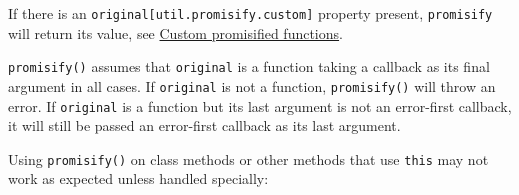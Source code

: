 \begin{Shaded}
\begin{Highlighting}[]
\OperatorTok{=} \NormalTok{(}\NormalTok{)}\OperatorTok{;}
\OperatorTok{=} \NormalTok{(}\NormalTok{)}\OperatorTok{;}

\OperatorTok{=}\NormalTok{)}\OperatorTok{;}

  \NormalTok{() \{}
  \OperatorTok{=}  \NormalTok{(}\NormalTok{)}\OperatorTok{;}
  \NormalTok{(}\SpecialCharTok{$\{}\SpecialCharTok{\}}\VerbatimStringTok{\textasciigrave{}}\NormalTok{)}\OperatorTok{;}
\NormalTok{\}}

\NormalTok{()}\OperatorTok{;}
\end{Highlighting}
\end{Shaded}

If there is an \texttt{original{[}util.promisify.custom{]}} property
present, \texttt{promisify} will return its value, see
\hyperref[custom-promisified-functions]{Custom promisified functions}.

\texttt{promisify()} assumes that \texttt{original} is a function taking
a callback as its final argument in all cases. If \texttt{original} is
not a function, \texttt{promisify()} will throw an error. If
\texttt{original} is a function but its last argument is not an
error-first callback, it will still be passed an error-first callback as
its last argument.

Using \texttt{promisify()} on class methods or other methods that use
\texttt{this} may not work as expected unless handled specially:


